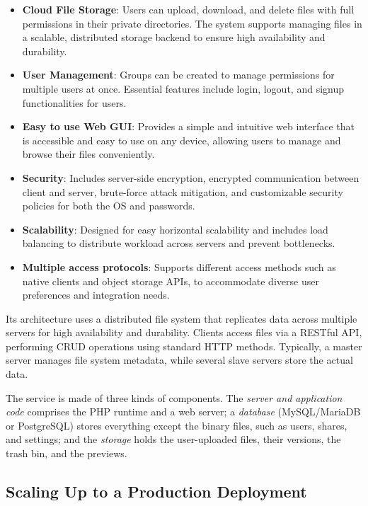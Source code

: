 \begin{itemize}[itemsep=0.4em]
    \item \textbf{Cloud File Storage}: Users can upload, download, and delete files with full permissions in their private directories. The system supports managing files in a scalable, distributed storage backend to ensure high availability and durability.
    \item \textbf{User Management}: Groups can be created to manage permissions for multiple users at once. Essential features include login, logout, and signup functionalities for users.
    \item \textbf{Easy to use Web GUI}: Provides a simple and intuitive web interface that is accessible and easy to use on any device, allowing users to manage and browse their files conveniently.
    \item \textbf{Security}: Includes server-side encryption, encrypted communication between client and server, brute-force attack mitigation, and customizable security policies for both the OS and passwords.
    \item \textbf{Scalability}: Designed for easy horizontal scalability and includes load balancing to distribute workload across servers and prevent bottlenecks.
    \item \textbf{Multiple access protocols}: Supports different access methods such as native clients and object storage APIs, to accommodate diverse user preferences and integration needs.
\end{itemize}
\smallskip


Its architecture uses a distributed file system that replicates data across multiple servers for high availability and durability. Clients access files via a RESTful API, performing CRUD operations using standard HTTP methods. Typically, a master server manages file system metadata, while several slave servers store the actual data.

\smallskip

The service is made of three kinds of components. The \emph{server and application code} comprises the PHP runtime and a web server; a \emph{database} (MySQL/MariaDB or PostgreSQL) stores everything except the binary files, such as users, shares, and settings; and the \emph{storage} holds the user-uploaded files, their versions, the trash bin, and the previews. 

\subsection{Scaling Up to a Production Deployment}

